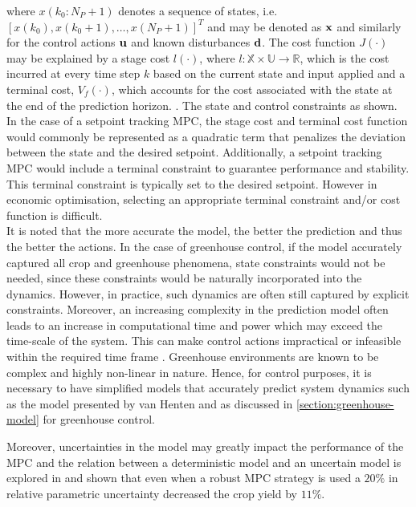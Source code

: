 where $x(k_0:N_P+1)$ denotes a sequence of states, i.e. $[x(k_0), x(k_0+1), \hdots, x(N_P+1)]^T$ and may be denoted as $\bold{x}$ and similarly for the control actions $\bold{u}$ and known disturbances $\bold{d}$. The cost function $J(\cdot)$ may be explained by a stage cost $l(\cdot)$, where $l: \mathbb X \times \mathbb U \rightarrow \mathbb R$, which is the cost incurred at every time step $k$ based on the current state and input applied and a terminal cost, $V_f(\cdot)$, which accounts for the cost associated with the state at the end of the prediction horizon. \cite{daiDiscreteTimeModelPredictive2012,boersmaRobustSamplebasedModel2022}. The state and control constraints as shown. In the case of a setpoint tracking MPC, the stage cost and terminal cost function would commonly be represented as a quadratic term that penalizes the deviation between the state and the desired setpoint. Additionally, a setpoint tracking MPC would include a terminal constraint to guarantee performance and stability. This terminal constraint is typically set to the desired setpoint. However in economic optimisation, selecting an appropriate terminal constraint and/or cost function is difficult.\\
It is noted that the more accurate the model, the better the prediction and thus the better the actions. In the case of greenhouse control, if the model accurately captured all crop and greenhouse phenomena, state constraints would not be needed, since these constraints would be naturally incorporated into the dynamics. However, in practice, such dynamics are often still captured by explicit constraints. Moreover, an increasing complexity in the prediction model often leads to an increase in computational time and power which may exceed the time-scale of the system. This can make control actions impractical or infeasible within the required time frame \cite{rawlingsModelPredictiveControl2017}. Greenhouse environments are known to be complex and highly non-linear in nature. Hence, for control purposes,  it is necessary to have simplified models that accurately predict system dynamics such as the model presented by van Henten \cite{hentenGreenhouseClimateManagement1994} and as discussed in \autoref{section:greenhouse-model} for greenhouse control. 

Moreover, uncertainties in the model may greatly impact the performance of the MPC and the relation between a deterministic model and an uncertain model is explored in \cite{boersmaRobustSamplebasedModel2022} and shown that even when a robust MPC strategy is used a $20\%$ in relative parametric uncertainty decreased the crop yield by $11\%$.

